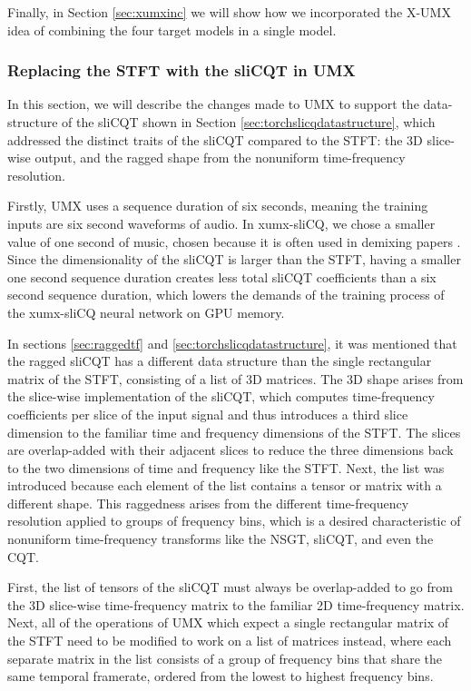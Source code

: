 \documentclass[report.tex]{subfiles}
\begin{document}
Finally, in Section \ref{sec:xumxinc} we will show how we incorporated the X-UMX idea of combining the four target models in a single model.

\subsubsection{Replacing the STFT with the sliCQT in UMX}
\label{sec:replacestft}

In this section, we will describe the changes made to UMX to support the data-structure of the sliCQT shown in Section \ref{sec:torchslicqdatastructure}, which addressed the distinct traits of the sliCQT compared to the STFT: the 3D slice-wise output, and the ragged shape from the nonuniform time-frequency resolution.

Firstly, UMX uses a sequence duration of six seconds, meaning the training inputs are six second waveforms of audio. In xumx-sliCQ, we chose a smaller value of one second of music, chosen because it is often used in demixing papers \parencite{plumbley1, plumbley2, demucs}. Since the dimensionality of the sliCQT is larger than the STFT, having a smaller one second sequence duration creates less total sliCQT coefficients than a six second sequence duration, which lowers the demands of the training process of the xumx-sliCQ neural network on GPU memory.

In sections \ref{sec:raggedtf} and \ref{sec:torchslicqdatastructure}, it was mentioned that the ragged sliCQT has a different data structure than the single rectangular matrix of the STFT, consisting of a list of 3D matrices. The 3D shape arises from the slice-wise implementation of the sliCQT, which computes time-frequency coefficients per slice of the input signal and thus introduces a third slice dimension to the familiar time and frequency dimensions of the STFT. The slices are overlap-added with their adjacent slices to reduce the three dimensions back to the two dimensions of time and frequency like the STFT. Next, the list was introduced because each element of the list contains a tensor or matrix with a different shape. This raggedness arises from the different time-frequency resolution applied to groups of frequency bins, which is a desired characteristic of nonuniform time-frequency transforms like the NSGT, sliCQT, and even the CQT.

First, the list of tensors of the sliCQT must always be overlap-added to go from the 3D slice-wise time-frequency matrix  to the familiar 2D time-frequency matrix. Next, all of the operations of UMX which expect a single rectangular matrix of the STFT need to be modified to work on a list of matrices instead, where each separate matrix in the list consists of a group of frequency bins that share the same temporal framerate, ordered from the lowest to highest frequency bins.
\end{document}
